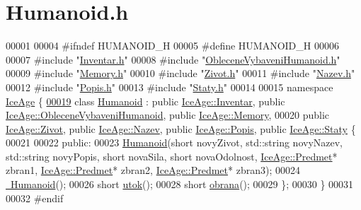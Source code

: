 \hypertarget{Humanoid_8h_source}{}\section{Humanoid.\+h}
\label{Humanoid_8h_source}

\begin{DoxyCode}
00001 
00004 \textcolor{preprocessor}{#ifndef HUMANOID\_H}
00005 \textcolor{preprocessor}{#define HUMANOID\_H}
00006 
00007 \textcolor{preprocessor}{#include "\hyperlink{Inventar_8h}{Inventar.h}"}
00008 \textcolor{preprocessor}{#include "\hyperlink{ObleceneVybaveniHumanoid_8h}{ObleceneVybaveniHumanoid.h}"}
00009 \textcolor{preprocessor}{#include "\hyperlink{Memory_8h}{Memory.h}"}
00010 \textcolor{preprocessor}{#include "\hyperlink{Zivot_8h}{Zivot.h}"}
00011 \textcolor{preprocessor}{#include "\hyperlink{Nazev_8h}{Nazev.h}"}
00012 \textcolor{preprocessor}{#include "\hyperlink{Popis_8h}{Popis.h}"}
00013 \textcolor{preprocessor}{#include "\hyperlink{Staty_8h}{Staty.h}"}
00014 
00015 \textcolor{keyword}{namespace }\hyperlink{namespaceIceAge}{IceAge} \{
\hypertarget{Humanoid_8h_source.tex_l00019}{}\hyperlink{classIceAge_1_1Humanoid}{00019}     \textcolor{keyword}{class }\hyperlink{classIceAge_1_1Humanoid}{Humanoid} : \textcolor{keyword}{public} \hyperlink{classIceAge_1_1Inventar}{IceAge::Inventar}, \textcolor{keyword}{public} 
      \hyperlink{classIceAge_1_1ObleceneVybaveniHumanoid}{IceAge::ObleceneVybaveniHumanoid}, \textcolor{keyword}{public} 
      \hyperlink{classIceAge_1_1Memory}{IceAge::Memory},
00020                      \textcolor{keyword}{public} \hyperlink{classIceAge_1_1Zivot}{IceAge::Zivot}, \textcolor{keyword}{public} \hyperlink{classIceAge_1_1Nazev}{IceAge::Nazev}, \textcolor{keyword}{public} 
      \hyperlink{classIceAge_1_1Popis}{IceAge::Popis}, \textcolor{keyword}{public} \hyperlink{classIceAge_1_1Staty}{IceAge::Staty} \{
00021 
00022     \textcolor{keyword}{public}:
00023         \hyperlink{classIceAge_1_1Humanoid_aa569118f9afa5ec9ddac4a9ec813d4ba}{Humanoid}(\textcolor{keywordtype}{short} novyZivot, std::string novyNazev, std::string novyPopis, \textcolor{keywordtype}{short} novaSila, \textcolor{keywordtype}{
      short} novaOdolnost, \hyperlink{classIceAge_1_1Predmet}{IceAge::Predmet}* zbran1, \hyperlink{classIceAge_1_1Predmet}{IceAge::Predmet}* zbran2, 
      \hyperlink{classIceAge_1_1Predmet}{IceAge::Predmet}* zbran3);
00024         \hyperlink{classIceAge_1_1Humanoid_a1d77af44d2b10d85f162ae959b05816d}{~Humanoid}();
00026         \textcolor{keywordtype}{short} \hyperlink{classIceAge_1_1Humanoid_aa8f63dfba3ef74a0666e9fb9c9e96df4}{utok}();
00028         \textcolor{keywordtype}{short} \hyperlink{classIceAge_1_1Humanoid_a76adfafa3855813fc09facab326ec87d}{obrana}();
00029     \};
00030 \}
00031 
00032 \textcolor{preprocessor}{#endif}
\end{DoxyCode}
